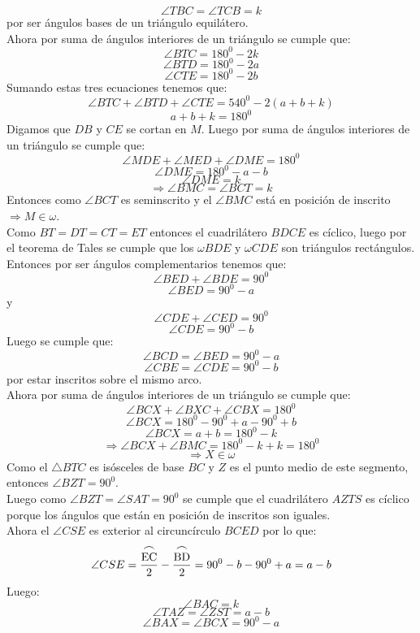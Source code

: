 \documentclass{book}
\begin{document}
\begin{enumerate}
          $$\angle TBC=\angle TCB=k$$
          por ser ángulos bases de un triángulo equilátero.\\
          Ahora por suma de ángulos interiores de un triángulo se cumple que:
          $$\angle BTC=180^0-2k$$
          $$\angle BTD=180^0-2a$$
          $$\angle CTE=180^0-2b$$
          Sumando estas tres ecuaciones tenemos que:
          $$\angle BTC+\angle BTD+\angle CTE=540^0-2(a+b+k)$$
          $$a+b+k=180^0$$
          Digamos que $DB$ y $CE$ se cortan en $M$. Luego por suma de ángulos interiores de un triángulo se cumple que:
          $$\angle MDE+\angle MED+\angle DME=180^0$$
          $$\angle DME=180^0-a-b$$
          $$\angle DME=k$$
          $$\Rightarrow\angle BMC=\angle BCT=k$$
          Entonces como $\angle BCT$ es seminscrito y el $\angle BMC$ está en posición de inscrito $\Rightarrow M\in\omega$.\\
          Como $BT=DT=CT=ET$ entonces el cuadrilátero $BDCE$ es cíclico, luego por el teorema de Tales se cumple que los $\omega BDE$ y $\omega CDE$ son triángulos rectángulos.\\
          Entonces por ser ángulos complementarios tenemos que:
          $$\angle BED+\angle BDE=90^0$$
          $$\angle BED=90^0-a$$
          y
          $$\angle CDE+\angle CED=90^0$$
          $$\angle CDE=90^0-b$$
          Luego se cumple que:
          $$\angle BCD=\angle BED=90^0-a$$
          $$\angle CBE=\angle CDE=90^0-b$$
          por estar inscritos sobre el mismo arco.\\
          Ahora por suma de ángulos interiores de un triángulo se cumple que:
          $$\angle BCX+\angle BXC+\angle CBX=180^0$$
          $$\angle BCX=180^0-90^0+a-90^0+b$$
          $$\angle BCX=a+b=180^0-k$$
          $$\Rightarrow\angle BCX+\angle BMC=180^0-k+k=180^0$$
          $$\Rightarrow X\in\omega$$
          Como el $\triangle BTC$ es isósceles de base $BC$ y $Z$ es el punto medio de este segmento, entonces $\angle BZT=90^0$.\\
          Luego como $\angle BZT=\angle SAT=90^0$ se cumple que el cuadrilátero $AZTS$ es cíclico porque los ángulos que están en posición de inscritos son iguales.\\
          Ahora el $\angle CSE$ es exterior al circuncírculo $BCED$ por lo que:
          $$\angle CSE={\stackrel{\textstyle\frown}{\mathrm{EC}}\over 2}-{\stackrel{\textstyle\frown}{\mathrm{BD}}\over 2}=90^0-b-90^0+a=a-b$$
          Luego:
          $$\angle BAC=k$$
          $$\angle TAZ=\angle ZST=a-b$$
          $$\angle BAX=\angle BCX=90^0-a$$

\end{enumerate}
\end{document}
